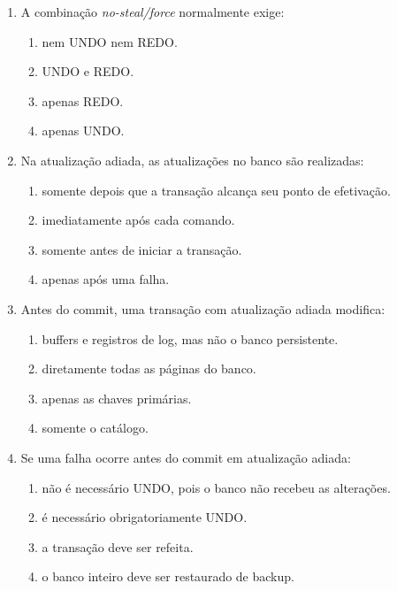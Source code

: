 \documentclass[12pt,a4paper]{article}
\begin{document}
\begin{enumerate}[label=\textbf{Q\arabic*.}]
\begin{enumerate}[label=\alph*)]
    \item somente UNDO.
    \item somente REDO.
    \item UNDO e REDO.
    \item nem UNDO nem REDO.
\end{enumerate}

\item A combinação \textit{no-steal/force} normalmente exige:

\begin{enumerate}[label=\alph*)]
    \item nem UNDO nem REDO.
    \item UNDO e REDO.
    \item apenas REDO.
    \item apenas UNDO.
\end{enumerate}

\item Na atualização adiada, as atualizações no banco são realizadas:

\begin{enumerate}[label=\alph*)]
    \item somente depois que a transação alcança seu ponto de efetivação.
    \item imediatamente após cada comando.
    \item somente antes de iniciar a transação.
    \item apenas após uma falha.
\end{enumerate}

\item Antes do commit, uma transação com atualização adiada modifica:

\begin{enumerate}[label=\alph*)]
    \item buffers e registros de log, mas não o banco persistente.
    \item diretamente todas as páginas do banco.
    \item apenas as chaves primárias.
    \item somente o catálogo.
\end{enumerate}

\item Se uma falha ocorre antes do commit em atualização adiada:

\begin{enumerate}[label=\alph*)]
    \item não é necessário UNDO, pois o banco não recebeu as alterações.
    \item é necessário obrigatoriamente UNDO.
    \item a transação deve ser refeita.
    \item o banco inteiro deve ser restaurado de backup.
\end{enumerate}


\end{enumerate}
\end{document}
